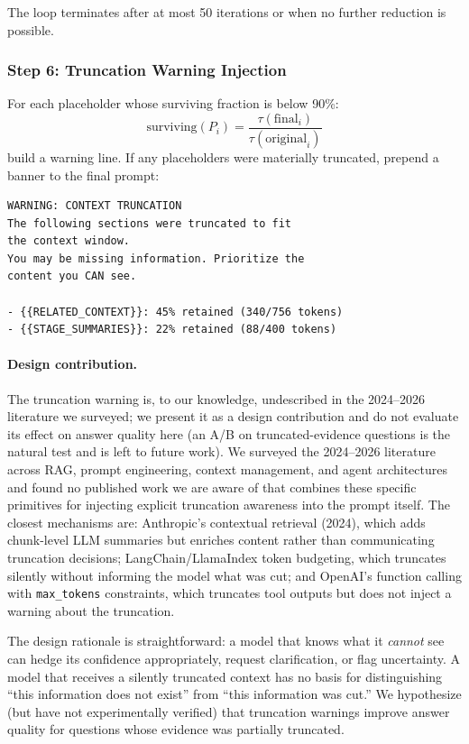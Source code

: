 \documentclass[11pt]{article}
\begin{document}
The loop terminates after at most 50 iterations or when no further
reduction is possible.

\subsubsection{Step 6: Truncation Warning Injection}

For each placeholder whose surviving fraction is below 90\%:
\begin{equation}
\text{surviving}(P_i) = \frac{\tau(\text{final}_i)}{\tau(\text{original}_i)}
\label{eq:surviving}
\end{equation}
build a warning line.  If any placeholders were materially truncated,
prepend a banner to the final prompt:

\begin{verbatim}
WARNING: CONTEXT TRUNCATION
The following sections were truncated to fit
the context window.
You may be missing information. Prioritize the
content you CAN see.

- {{RELATED_CONTEXT}}: 45% retained (340/756 tokens)
- {{STAGE_SUMMARIES}}: 22% retained (88/400 tokens)
\end{verbatim}

\paragraph{Design contribution.}
The truncation warning is, to our knowledge, undescribed in the
2024--2026 literature we surveyed; we present it as a design
contribution and do not evaluate its effect on answer quality here
(an A/B on truncated-evidence questions is the natural test and is
left to future work).  We surveyed the
2024--2026 literature across RAG, prompt engineering, context
management, and agent architectures and found no published work we are aware of that combines these specific primitives
for injecting explicit truncation awareness into the prompt itself.
The closest mechanisms are: Anthropic's contextual retrieval (2024),
which adds chunk-level LLM summaries but enriches content rather than
communicating truncation decisions; LangChain/LlamaIndex token
budgeting, which truncates silently without informing the model what
was cut; and OpenAI's function calling with \texttt{max\_tokens}
constraints, which truncates tool outputs but does not inject a
warning about the truncation.

The design rationale is straightforward: a model that knows what it
\emph{cannot} see can hedge its confidence appropriately, request
clarification, or flag uncertainty.  A model that receives a silently
truncated context has no basis for distinguishing ``this information
does not exist'' from ``this information was cut.''  We hypothesize
(but have not experimentally verified) that truncation warnings
improve answer quality for questions whose evidence was partially
truncated.
\end{document}
